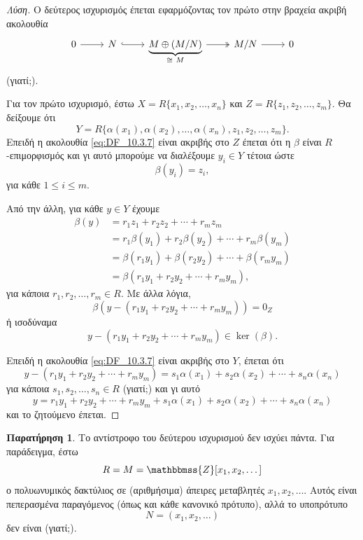\documentclass[12pt,a4paper,reqno]{amsart}
\theoremstyle{definition}
\newtheorem*{remark}{Παρατήρηση}
\newcommand{\ZZ}{\mathbbmss{Z}}
\begin{document}
\begin{proof}[Λύση]
  Ο δεύτερος ισχυρισμός έπεται εφαρμόζοντας τον πρώτο στην βραχεία ακριβή ακολουθία 
  \[
    \begin{tikzcd}
        0 \arrow[r] & N \arrow[r, hook] & \underbrace{M \oplus (M/N)}_{\cong \ M} \arrow[r, two heads] & M/N \arrow[r] & 0
    \end{tikzcd}
  \]
  (γιατί;).
  
  Για τον πρώτο ισχυρισμό, έστω $X = R\{x_1, x_2, \dots, x_n\}$ και $Z = R\{z_1, z_2, \dots, z_m\}$. Θα δείξουμε ότι 
  \[
  Y = R\{\alpha(x_1), \alpha(x_2), \dots, \alpha(x_n), z_1, z_2, \dots, z_m\}.
  \] 
  Επειδή η ακολουθία \eqref{eq:DF_10.3.7} είναι ακριβής στο $Z$ έπεται ότι η $\beta$ είναι $R$-επιμορφισμός και γι αυτό μπορούμε να διαλέξουμε $y_i \in Y$ τέτοια ώστε 
  \[
  \beta(y_i) = z_i,
  \]
  για κάθε $1 \le i \le m$. 

  Από την άλλη, για κάθε $y \in Y$ έχουμε 
  \begin{align*}
  \beta(y) &= r_1z_1 + r_2z_2 + \cdots + r_mz_m \\ 
  &= r_1\beta(y_1) + r_2\beta(y_2) + \cdots + r_m\beta(y_m) \\
  &= \beta(r_1y_1) + \beta(r_2y_2) + \cdots + \beta(r_my_m) \\
  &= \beta\left(
    r_1y_1 + r_2y_2 + \cdots + r_my_m
  \right),
  \end{align*}
  για κάποια $r_1, r_2, \dots, r_m \in R$. Με άλλα λόγια, 
  \[
  \beta\left(
    y - \left(
    r_1y_1 + r_2y_2 + \cdots + r_my_m
    \right)
  \right) = 0_Z
  \]
  ή ισοδύναμα 
  \[
  y - \left(
    r_1y_1 + r_2y_2 + \cdots + r_my_m
    \right) \in \ker(\beta).
  \]

  Επειδή η ακολουθία \eqref{eq:DF_10.3.7} είναι ακριβής στο $Y$, έπεται ότι 
  \[
  y - \left(
    r_1y_1 + r_2y_2 + \cdots + r_my_m
    \right) = s_1\alpha(x_1) + s_2\alpha(x_2) + \cdots + s_n\alpha(x_n)
  \]
  για κάποια $s_1, s_2, \dots, s_n \in R$ (γιατί;) και γι αυτό
  \[
  y = r_1y_1 + r_2y_2 + \cdots + r_my_m + s_1\alpha(x_1) + s_2\alpha(x_2) + \cdots + s_n\alpha(x_n)
  \]
  και το ζητούμενο έπεται.
\end{proof}

\begin{remark}
  Το αντίστροφο του δεύτερου ισχυρισμού δεν ισχύει πάντα. Για παράδειγμα, έστω 
  \[
  R = M = \ZZ[x_1, x_2, \dots]
  \]
  ο πολυωνυμικός δακτύλιος σε (αριθμήσιμα) άπειρες μεταβλητές $x_1, x_2, \dots$. Αυτός είναι πεπερασμένα παραγόμενος (όπως και κάθε κανονικό πρότυπο), αλλά το υποπρότυπο 
  \[ 
  N = (x_1, x_2, \dots)
  \] 
  δεν είναι (γιατί;).
\end{remark}
\end{document}
